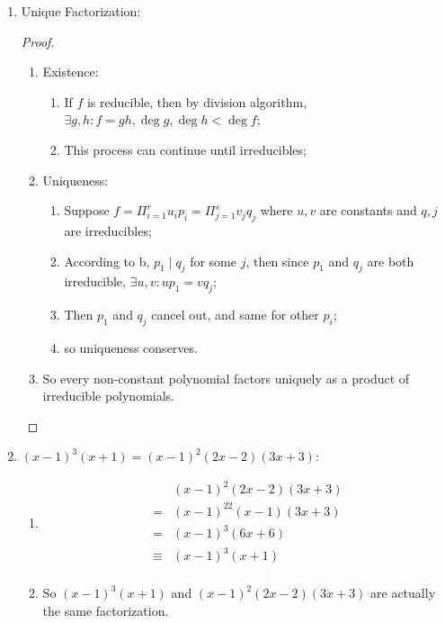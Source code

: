 \documentclass[11pt]{article}
\begin{document}
\begin{enumerate}
\begin{proof}
\begin{enumerate}
            \item $p\mid rs$, so $rs\in\langle p\rangle$;
            \item $\langle p\rangle$ is prime, so $rs\in\langle p\rangle\implies r\in\langle p\rangle\lor s\in\langle p\rangle$;
            \item So $r\in\langle p\rangle\lor s\in\langle p\rangle$;
            \item This is equivalent to $p\mid r\lor p\mid s$.
        \end{enumerate}
    \end{proof}
    \item Unique Factorization:
    \begin{proof}
        ~
        \begin{enumerate}
            \item Existence:
            \begin{enumerate}
                \item If $f$ is reducible, then by division algorithm, $\exists g,h:f=gh,\deg g,\deg h<\deg f$;
                \item This process can continue until irreducibles;
            \end{enumerate}
            \item Uniqueness:
            \begin{enumerate}
                \item Suppose $f=\Pi_{i=1}^ru_ip_i=\Pi_{j=1}^sv_jq_j$ where $u,v$ are constants and $q,j$ are irreducibles;
                \item According to b, $p_1\mid q_j$ for some $j$, then since $p_1$ and $q_j$ are both irreducible, $\exists u,v:up_1=vq_j$;
                \item Then $p_1$ and $q_j$ cancel out, and same for other $p_i$;
                \item so uniqueness conserves.
            \end{enumerate}
            \item So every non-constant polynomial factors uniquely as a product of irreducible polynomials.
        \end{enumerate}
    \end{proof}
    \item $(x-1)^3(x+1)=(x-1)^2(2x-2)(3x+3)$:
    \begin{enumerate}
        \item \begin{align*}
        &(x-1)^2(2x-2)(3x+3)\\
        =&(x-1)^22(x-1)(3x+3)\\
        =&(x-1)^3(6x+6)\\
        \equiv&(x-1)^3(x+1)\\
    \end{align*}
    \item So $(x-1)^3(x+1)$ and $(x-1)^2(2x-2)(3x+3)$ are actually the same factorization.
    \end{enumerate}
\end{enumerate}
\end{document}
